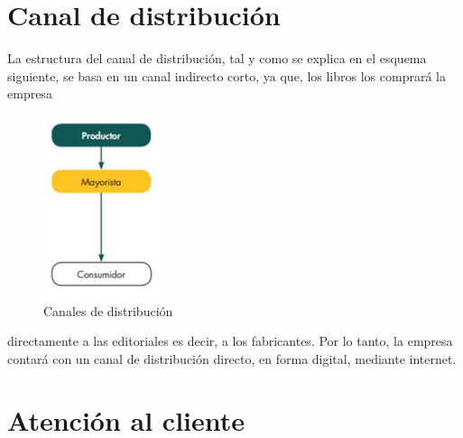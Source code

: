 \documentclass[openany,overnay,a4paper, twoside, 12pt]{book}
\begin{document}
\section{Canal de distribución}
La estructura del canal de distribución, tal y como se explica en el esquema siguiente, se basa en un canal indirecto corto, ya que, los libros los comprará la empresa 
\begin{figure}
\includegraphics[width=0.9\linewidth]{imagenes/canales de distribucion.png} 
\caption{Canales de distribución}
\end{figure}
  directamente a las editoriales es decir, a los fabricantes. Por lo tanto, la empresa contará con un canal de distribución directo, en forma digital, mediante internet.

\clearpage %
\newpage

\section{Atención al cliente}
\end{document}
